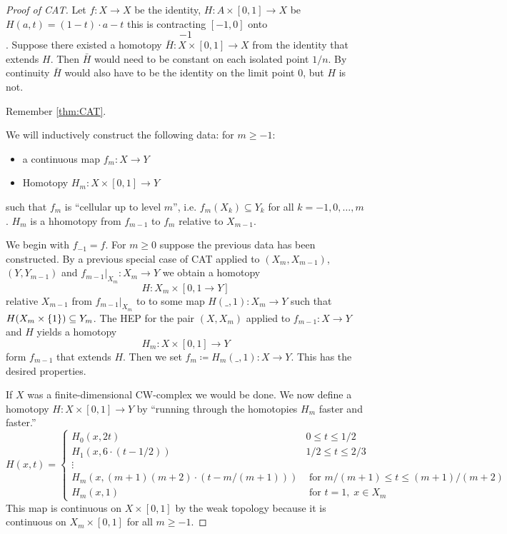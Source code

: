 \documentclass{TemplateLecture}
\begin{document}
\begin{proof}[Proof of CAT]
    Let \(f\colon X \to X\) be the identity, \(H\colon A \times [0,1] \to X \) be \(H(a,t) = (1-t) \cdot a - t\) this is contracting \([-1,0]\) onto \[-1\]. Suppose there existed a homotopy \(\bar H \colon X \times [0,1] \to X\) from the identity that extends \(H\). Then \(\bar H\) would need to be constant on each isolated point \(1/n\). By continuity \(\bar H\) would also have to be the identity on the limit point \(0\), but \(H\) is not.

    Remember \ref{thm:CAT}.

    We will inductively construct the following data: for \(m \geq -1\):
    \begin{itemize}
        \item a continuous map \(f_m \colon X \to Y\)
        \item Homotopy \(H_m \colon X \times [0, 1] \to Y\)
    \end{itemize}
    such that \(f_m\) is \enquote{cellular up to level \(m\)}, i.e. \(f_m(X_k) \subseteq Y_k\) for all \(k = -1, 0, \dots, m\).
    \(H_m\) is a hhomotopy from \(f_{m-1}\) to \(f_m\) relative to \(X_{m-1}\).

    We begin with \(f_{-1} = f\). For \(m \geq 0\) suppose the previous data has been constructed. By a previous special case of CAT applied to \((X_m, X_{m-1})\), \((Y, Y_{m-1})\) and \(f_{m-1}\rvert_{X_m} \colon X_m \to Y\) we obtain a homotopy
    \[H\colon X_m \times [0,1 \to Y]\]
    relative \(X_{m-1}\) from \(f_{m-1} \rvert_{X_m}\) to to some map \(H(\_, 1)\colon X_m \to Y\) such that \(H(X_m \times \{1\}) \subseteq Y_m\). The HEP for the pair \((X, X_m)\) applied to \(f_{m-1} \colon X \to Y\) and \(H\) yields a homotopy
    \[H_m \colon X \times [0,1] \to Y\]
    form \(f_{m-1}\) that extends \(H\). Then we set \(f_m \coloneq H_m(\_,1)\colon X \to Y\). This has the desired properties.

    If \(X\) was a finite-dimensional CW-complex we would be done.
    We now define a homotopy \(H\colon X \times [0,1] \to Y\) by \enquote{running through the homotopies \(H_m\) faster and faster.}
    \[H(x,t) = \begin{cases}
        H_0(x, 2t) & 0 \leq t \leq 1/2 \\
        H_1(x, 6 \cdot (t - 1/2)) & 1/2 \leq t \leq 2/3 \\
        \vdots & \\
        H_m(x, (m+1)(m+2) \cdot (t - m/(m+1))) & \text{ for } m/(m+1) \leq t \leq (m+1)/(m+2) \\
        H_m(x,1) & \text{ for } t = 1, \;x \in X_m
    \end{cases}\]
    This map is continuous on \(X \times [0,1]\) by the weak topology because it is continuous on \(X_m \times [0,1]\) for all \(m \geq -1\).
\end{proof}
\end{document}
